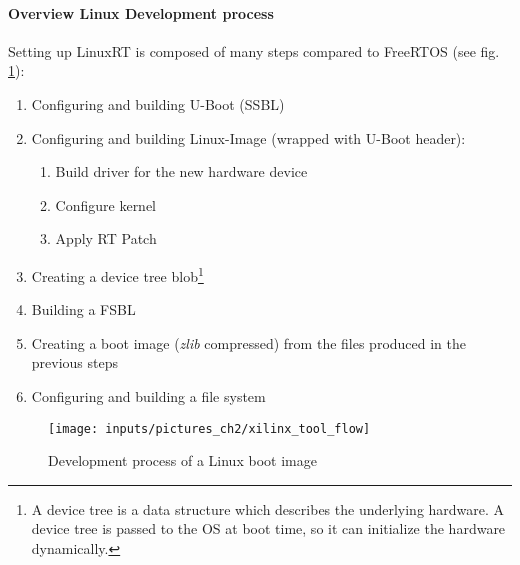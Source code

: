 \paragraph{Overview Linux Development process}
Setting up LinuxRT is composed of many steps compared to FreeRTOS (see fig. \ref{fig_xilinx_tool_flow}):
\begin{enumerate}
	\item Configuring and building U-Boot (\ac{SSBL})
	\item Configuring and building Linux-Image (wrapped with U-Boot header):
		\begin{enumerate}
			\item Build driver for the new hardware device
			\item Configure kernel
			\item Apply RT Patch
		\end{enumerate}
	\item Creating a device tree blob\footnote{A device tree is a data structure which describes the underlying hardware. A device tree is passed to the \ac{OS} at boot time, so it can initialize the hardware dynamically.\cite{device_tree}}
	\item Building a \ac{FSBL}
	\item Creating a boot image (\textit{zlib} compressed) from the files produced in the previous steps 
	\item Configuring and building a file system
\end{enumerate}

\begin{figure}[htb]
		\begin{center}
			\texttt{[image: inputs/pictures\_ch2/xilinx\_tool\_flow]}
			\caption[Development process of a Linux boot image]{Development process of a Linux boot image \cite{xilinx:gt}} \label{fig_xilinx_tool_flow}
		\end{center}
\end{figure} 

